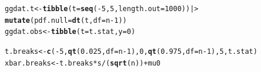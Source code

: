 \documentclass{article}\usepackage[]{graphicx}\usepackage[]{xcolor}
\makeatletter
\newcommand{\hlnum}[1]{\textcolor[rgb]{0.686,0.059,0.569}{#1}}%
\newcommand{\hlopt}[1]{\textcolor[rgb]{0,0,0}{#1}}%
\newcommand{\hldef}[1]{\textcolor[rgb]{0.345,0.345,0.345}{#1}}%
\newcommand{\hlkwb}[1]{\textcolor[rgb]{0.69,0.353,0.396}{#1}}%
\newcommand{\hlkwc}[1]{\textcolor[rgb]{0.333,0.667,0.333}{#1}}%
\newcommand{\hlkwd}[1]{\textcolor[rgb]{0.737,0.353,0.396}{\textbf{#1}}}%
\newenvironment{kframe}{%
 \def\at@end@of@kframe{}%
 \ifinner\ifhmode%
  \def\at@end@of@kframe{\end{minipage}}%
  \begin{minipage}{\columnwidth}%
 \fi\fi%
 \def\FrameCommand##1{\hskip\@totalleftmargin \hskip-\fboxsep
 \colorbox{shadecolor}{##1}\hskip-\fboxsep
     \hskip-\linewidth \hskip-\@totalleftmargin \hskip\columnwidth}%
 \MakeFramed {\advance\hsize-\width
   \@totalleftmargin\z@ \linewidth\hsize
   \@setminipage}}%
 {\par\unskip\endMakeFramed%
 \at@end@of@kframe}
\newenvironment{knitrout}{}{} %
\makeatother
\begin{document}
\begin{enumerate}
\begin{enumerate}
\begin{knitrout}
\begin{kframe}
\begin{alltt}
\hldef{ggdat.t} \hlkwb{<-} \hlkwd{tibble}\hldef{(}\hlkwc{t} \hldef{=} \hlkwd{seq}\hldef{(}\hlopt{-}\hlnum{5}\hldef{,} \hlnum{5}\hldef{,} \hlkwc{length.out} \hldef{=} \hlnum{1000}\hldef{)) |>}
  \hlkwd{mutate}\hldef{(}\hlkwc{pdf.null} \hldef{=} \hlkwd{dt}\hldef{(t,} \hlkwc{df} \hldef{= n} \hlopt{-} \hlnum{1}\hldef{))}
\hldef{ggdat.obs} \hlkwb{<-} \hlkwd{tibble}\hldef{(}\hlkwc{t} \hldef{= t.stat,} \hlkwc{y} \hldef{=} \hlnum{0}\hldef{)}

\hldef{t.breaks} \hlkwb{<-} \hlkwd{c}\hldef{(}\hlopt{-}\hlnum{5}\hldef{,} \hlkwd{qt}\hldef{(}\hlnum{0.025}\hldef{,} \hlkwc{df} \hldef{= n} \hlopt{-} \hlnum{1}\hldef{),} \hlnum{0}\hldef{,} \hlkwd{qt}\hldef{(}\hlnum{0.975}\hldef{,} \hlkwc{df} \hldef{= n} \hlopt{-} \hlnum{1}\hldef{),} \hlnum{5}\hldef{, t.stat)}
\hldef{xbar.breaks} \hlkwb{<-} \hldef{t.breaks} \hlopt{*} \hldef{s}\hlopt{/}\hldef{(}\hlkwd{sqrt}\hldef{(n))} \hlopt{+} \hldef{mu0}


\end{alltt}
\end{kframe}
\end{knitrout}
\end{enumerate}
\end{enumerate}
\end{document}
